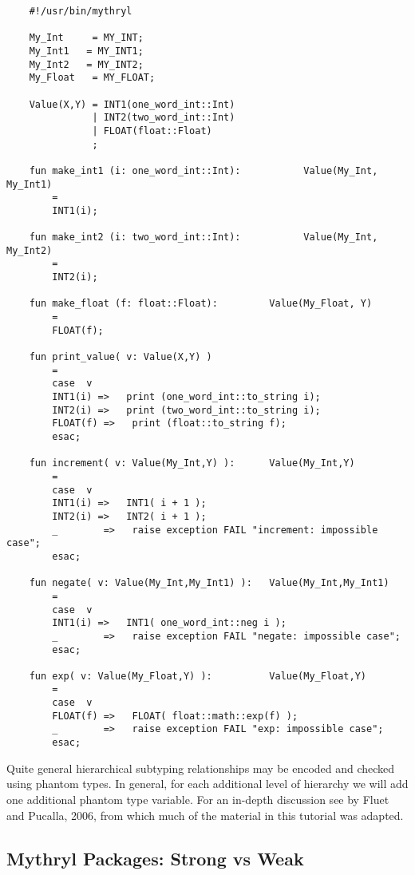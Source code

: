 \begin{verbatim}
    #!/usr/bin/mythryl

    My_Int     = MY_INT;
    My_Int1   = MY_INT1;
    My_Int2   = MY_INT2;
    My_Float   = MY_FLOAT;

    Value(X,Y) = INT1(one_word_int::Int) 
               | INT2(two_word_int::Int)
               | FLOAT(float::Float)
               ;

    fun make_int1 (i: one_word_int::Int):           Value(My_Int, My_Int1)
        =
        INT1(i);

    fun make_int2 (i: two_word_int::Int):           Value(My_Int, My_Int2)
        =
        INT2(i);

    fun make_float (f: float::Float):         Value(My_Float, Y)
        =
        FLOAT(f);

    fun print_value( v: Value(X,Y) )
        =
        case  v
        INT1(i) =>   print (one_word_int::to_string i);
        INT2(i) =>   print (two_word_int::to_string i);
        FLOAT(f) =>   print (float::to_string f);
        esac;

    fun increment( v: Value(My_Int,Y) ):      Value(My_Int,Y)
        =
        case  v
        INT1(i) =>   INT1( i + 1 );
        INT2(i) =>   INT2( i + 1 );
        _        =>   raise exception FAIL "increment: impossible case";
        esac;

    fun negate( v: Value(My_Int,My_Int1) ):   Value(My_Int,My_Int1)
        =
        case  v
        INT1(i) =>   INT1( one_word_int::neg i );
        _        =>   raise exception FAIL "negate: impossible case";
        esac;

    fun exp( v: Value(My_Float,Y) ):          Value(My_Float,Y)
        =
        case  v
        FLOAT(f) =>   FLOAT( float::math::exp(f) );
        _        =>   raise exception FAIL "exp: impossible case";
        esac;
\end{verbatim}

Quite general hierarchical subtyping relationships may be encoded and checked 
using phantom types.  In general, for each additional level of hierarchy we 
will add one additional phantom type variable.  For an in-depth discussion see 
 by Fluet and Pucalla, 2006, 
from which much of the material in this tutorial was adapted.

\cutend*

\subsection{Mythryl Packages:  Strong vs Weak}

